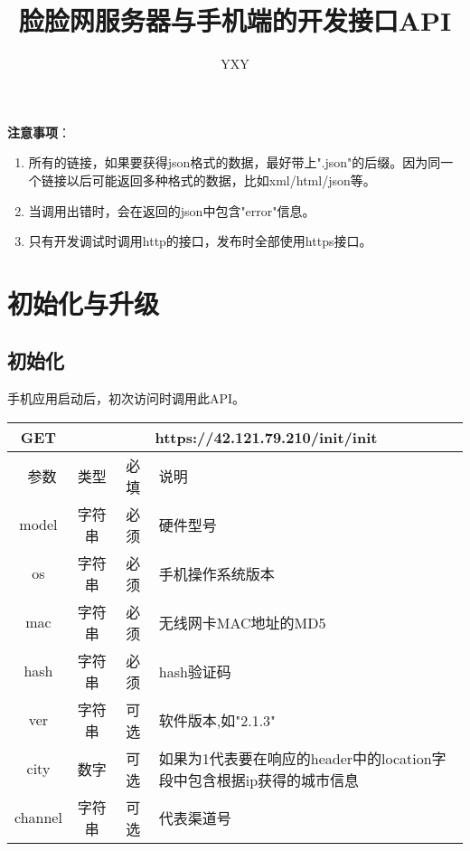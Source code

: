 \documentclass[cs4size]{ctexartutf8}
\author{YXY}
\title{脸脸网服务器与手机端的开发接口API}
\begin{document}
 
\maketitle
\tableofcontents

\newpage

\textbf{注意事项}：
\begin{enumerate}
\item 所有的链接，如果要获得json格式的数据，最好带上".json"的后缀。因为同一个链接以后可能返回多种格式的数据，比如xml/html/json等。
\item 当调用出错时，会在返回的json中包含"error"信息。
\item 只有开发调试时调用http的接口，发布时全部使用https接口。
\end{enumerate}

\newpage

\section{初始化与升级}
\subsection{初始化}

手机应用启动后，初次访问时调用此API。
\begin{table}[H]
   \begin{center}
\begin{tabular}{|c|c|c|p{12cm}|}
\hline
GET & \multicolumn{3}{|c|}{https://42.121.79.210/init/init} \\
\hline\hline
 \  参数  & 类型 & 必填 &  说明  \\
 \hline
 model  & 字符串 & 必须 &  硬件型号\\
\hline
 os  & 字符串 & 必须 &  手机操作系统版本\\
 \hline
 mac  & 字符串 & 必须 &  无线网卡MAC地址的MD5\\
 \hline
 hash  & 字符串 & 必须 &  hash验证码\\
  \hline
 ver  & 字符串 & 可选 &  软件版本,如"2.1.3"\\
  \hline
 city  & 数字 & 可选 &  如果为1代表要在响应的header中的location字段中包含根据ip获得的城市信息\\ 
\hline
 channel  & 字符串 & 可选 &  代表渠道号\\
\hline
\end{tabular}
   \end{center}
\end{table}
\end{document}
